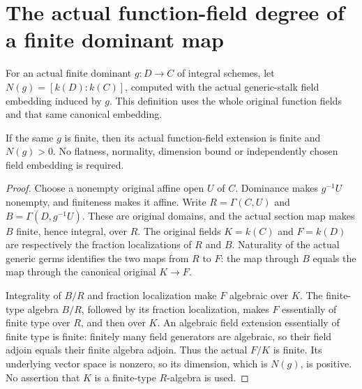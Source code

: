 \section{The actual function-field degree of a finite dominant map}

\begin{definition}
\label{def:intrinsic-numerical-canonical-function-field-degree}
\leanok
For an actual finite dominant $g:D\to C$ of integral schemes, let
$N(g)=[k(D):k(C)]$, computed with the actual generic-stalk field
embedding induced by $g$. This definition uses the whole original
function fields and that same canonical embedding.
\end{definition}

\begin{theorem}
\label{thm:intrinsic-numerical-function-field-degree-positive}
\leanok
If the same $g$ is finite, then its actual function-field extension is
finite and $N(g)>0$. No flatness, normality, dimension bound or
independently chosen field embedding is required.
\end{theorem}
\begin{proof}
Choose a nonempty original affine open $U$ of $C$. Dominance makes
$g^{-1}U$ nonempty, and finiteness makes it affine. Write
$R=\Gamma(C,U)$ and $B=\Gamma(D,g^{-1}U)$. These are original domains,
and the actual section map makes $B$ finite, hence integral, over $R$.
The original fields $K=k(C)$ and $F=k(D)$ are respectively the fraction
localizations of $R$ and $B$. Naturality of the actual generic germs
identifies the two maps from $R$ to $F$: the map through $B$ equals the
map through the canonical original $K\to F$.

Integrality of $B/R$ and fraction localization make $F$ algebraic over
$K$. The finite-type algebra $B/R$, followed by its fraction
localization, makes $F$ essentially of finite type over $R$, and then
over $K$. An algebraic field extension essentially of finite type is
finite: finitely many field generators are algebraic, so their field
adjoin equals their finite algebra adjoin. Thus the actual $F/K$ is
finite. Its underlying vector space is nonzero, so its dimension,
which is $N(g)$, is positive. No assertion that $K$ is a finite-type
$R$-algebra is used.
\end{proof}

